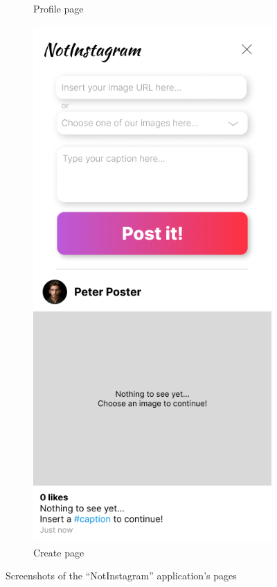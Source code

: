 \documentclass[a4paper, 12pt]{article}
\begin{document}
\begin{figure}[h]
\begin{subfigure}{0.24\linewidth}
\begin{center}
    \end{center}
    \caption{Profile page}\label{subfig:user}
  \end{subfigure}
  \begin{subfigure}{0.24\linewidth}
    \begin{center}
      \includegraphics[width=\linewidth, height=0.3\textheight, keepaspectratio,frame]{img/ig-clone/Beitrag erstellen.png}
    \end{center}
    \caption{Create page}\label{subfig:create}
  \end{subfigure}
  \caption{Screenshots of the \enquote{NotInstagram} application's pages}\label{fig:screenshots}
\end{figure}
\end{document}
